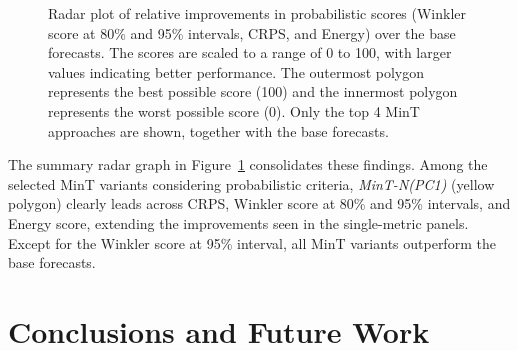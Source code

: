 \documentclass[
  11pt,
  letterpaper,
  DIV=11,
  numbers=noendperiod,
  titlepage]{scrartcl}
\begin{document}
\begin{figure}


\caption{\label{fig-tourism-radar}Radar plot of relative improvements in
probabilistic scores (Winkler score at 80\% and 95\% intervals, CRPS,
and Energy) over the base forecasts. The scores are scaled to a range of
0 to 100, with larger values indicating better performance. The
outermost polygon represents the best possible score (100) and the
innermost polygon represents the worst possible score (0). Only the top
4 MinT approaches are shown, together with the base forecasts.}

\end{figure}%

The summary radar graph in Figure~\ref{fig-tourism-radar} consolidates
these findings. Among the selected MinT variants considering
probabilistic criteria, \emph{MinT-N(PC1)} (yellow polygon) clearly
leads across CRPS, Winkler score at 80\% and 95\% intervals, and Energy
score, extending the improvements seen in the single-metric panels.
Except for the Winkler score at 95\% interval, all MinT variants
outperform the base forecasts.

\section{Conclusions and Future Work}\label{sec-conclusion}
\end{document}
